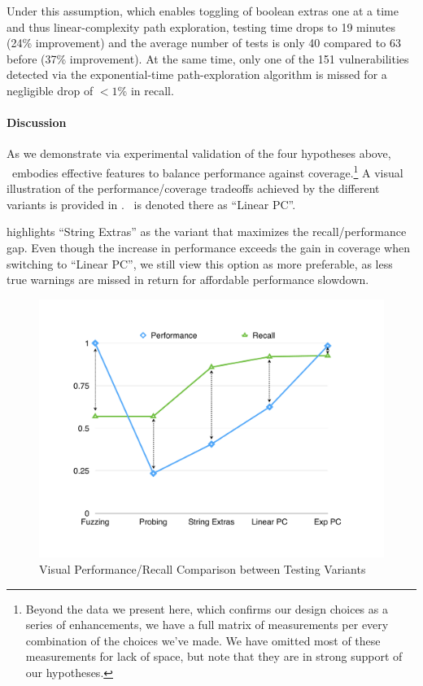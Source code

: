 Under this assumption, which enables toggling of boolean extras one at a time and thus linear-complexity path exploration, testing time drops to 19 minutes (24\% improvement) and the average number of tests is only 40 compared to 63 before (37\% improvement). At the same time, only one of the 151 vulnerabilities detected via the exponential-time path-exploration algorithm is missed for a negligible drop of $<1$\% in recall.

\paragraph{Discussion} As we demonstrate via experimental validation of the four hypotheses above, \Tool\ embodies effective features to balance performance against coverage.\footnote{
	Beyond the data we present here, which confirms our design choices as a series of enhancements, we have a full matrix of measurements per every combination of the choices we've made. We have omitted most of these measurements for lack of space, but note that they are in strong support of our hypotheses.
} A visual illustration of the performance/coverage tradeoffs achieved by the different variants is provided in . \Tool\ is denoted there as ``Linear PC''.

 highlights ``String Extras'' as the variant that maximizes the recall/performance gap. Even though the increase in performance exceeds the gain in coverage when switching to ``Linear PC'', we still view this option as more preferable, as less true warnings are missed in return for affordable performance slowdown.

\begin{figure}
	\includegraphics[width=\columnwidth]{trendline.pdf}
	\caption{\label{Fi:trends}Visual Performance/Recall Comparison between Testing Variants}
\end{figure}

